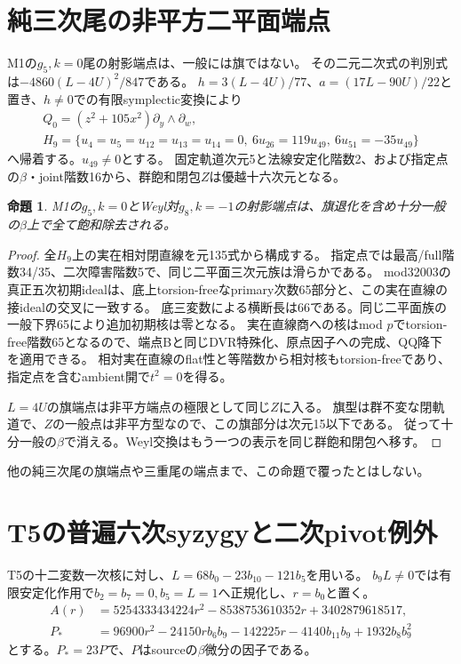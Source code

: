 \documentclass[11pt,a4paper]{ltjsarticle}
\newtheorem{proposition}[theorem]{命題}
\theoremstyle{remark}
\begin{document}
\section{純三次尾の非平方二平面端点}
M1の$g_5,k=0$尾の射影端点は、一般には旗ではない。
その二元二次式の判別式は$-4860(L-4U)^2/847$である。
$h=3(L-4U)/77$、$a=(17L-90U)/22$と置き、$h\ne0$での有限symplectic変換により
\begin{gather*}
 Q_0=(z^2+105x^2)\partial_y\wedge\partial_w,\\
 H_9=\{u_4=u_5=u_{12}=u_{13}=u_{14}=0,\ 6u_{26}=119u_{49},\ 6u_{51}=-35u_{49}\}
\end{gather*}
へ帰着する。$u_{49}\ne0$とする。
固定軌道次元5と法線安定化階数2、および指定点の$\beta$・joint階数16から、群飽和閉包$Z$は優越十六次元となる。

\begin{proposition}
M1の$g_5,k=0$とWeyl対$g_8,k=-1$の射影端点は、旗退化を含め十分一般の$\beta$上で全て飽和除去される。
\end{proposition}
\begin{proof}
全$H_9$上の実在相対閉直線を元135式から構成する。
指定点では最高/full階数34/35、二次障害階数5で、同じ二平面三次元族は滑らかである。
mod32003の真正五次初期idealは、底上torsion-freeなprimary次数65部分と、この実在直線の接idealの交叉に一致する。
底三変数による横断長は66である。同じ二平面族の一般下界65により追加初期核は零となる。
実在直線商への核はmod $p$でtorsion-free階数65となるので、端点Bと同じDVR特殊化、原点因子への完成、QQ降下を適用できる。
相対実在直線のflat性と等階数から相対核もtorsion-freeであり、指定点を含むambient開で$t^2=0$を得る。

$L=4U$の旗端点は非平方端点の極限として同じ$Z$に入る。
旗型は群不変な閉軌道で、$Z$の一般点は非平方型なので、この旗部分は次元15以下である。
従って十分一般の$\beta$で消える。Weyl交換はもう一つの表示を同じ群飽和閉包へ移す\cite{pure-binary-v44}。
\end{proof}
他の純三次尾の旗端点や三重尾の端点まで、この命題で覆ったとはしない。

\section{T5の普遍六次syzygyと二次pivot例外}
T5の十二変数一次核に対し、$L=68b_0-23b_{10}-121b_5$を用いる。
$b_9L\ne0$では有限安定化作用で$b_2=b_7=0,b_5=L=1$へ正規化し、$r=b_0$と置く。
\begin{align*}
 A(r)&=5254333434224r^2-8538753610352r+3402879618517,\\
 P_*&=96900r^2-24150rb_6b_9-142225r-4140b_{11}b_9+1932b_8b_9^2
\end{align*}
とする。$P_*=23P$で、$P$はsourceの$\beta$微分の因子である。
\end{document}

